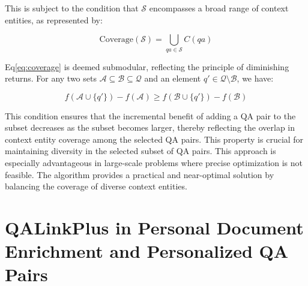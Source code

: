 \documentclass[11pt]{article}
\begin{document}




This is subject to the condition that \( \mathcal{S} \) encompasses a broad range of context entities, as represented by:

\begin{equation}
\label{eq:coverage}
\text{Coverage}(\mathcal{S}) = \bigcup_{qa \in \mathcal{S}} C(qa)
\end{equation}

Eq\ref{eq:coverage} is deemed submodular, reflecting the principle of diminishing returns. For any two sets \( \mathcal{A} \subseteq \mathcal{B} \subseteq \mathcal{Q} \) and an element \( q' \in \mathcal{Q} \setminus \mathcal{B} \), we have:

\begin{equation}
f(\mathcal{A} \cup \{q'\}) - f(\mathcal{A}) \geq f(\mathcal{B} \cup \{q'\}) - f(\mathcal{B})
\end{equation}

This condition ensures that the incremental benefit of adding a QA pair to the subset decreases as the subset becomes larger, thereby reflecting the overlap in context entity coverage among the selected QA pairs. This property is crucial for maintaining diversity in the selected subset of QA pairs. This approach is especially advantageous in large-scale problems where precise optimization is not feasible. The algorithm provides a practical and near-optimal solution by balancing the coverage of diverse context entities.



\section{QALinkPlus in Personal Document Enrichment and Personalized QA Pairs}
\label{Pesonalization}
\end{document}
